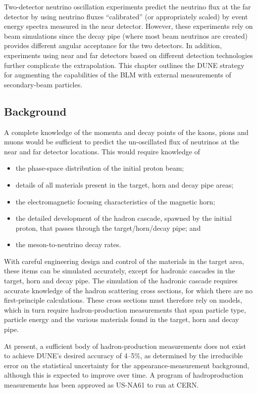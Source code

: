 Two-detector neutrino oscillation experiments predict the neutrino
flux at the far detector by using neutrino fluxes ``calibrated'' (or
appropriately scaled) by event energy spectra measured in the near
detector. However, these experiments rely on beam simulations since
the decay pipe (where most beam neutrinos are created) provides
different angular acceptance for the two detectors. In addition,
experiments using near and far detectors based on different detection
technologies further complicate the extrapolation. This chapter
outlines the DUNE strategy for augmenting the capabilities of the BLM
with external measurements of secondary-beam particles.

\subsection{Background}

A complete knowledge of the momenta and decay points of the kaons, pions and
muons would be sufficient to  predict the un-oscillated flux of neutrinos
at the near and far detector locations. This would require knowledge of

\begin{itemize}
\item the phase-space distribution of the initial proton beam;
\item details of all materials present in the target, horn and decay pipe areas;
\item  the electromagnetic focusing characteristics of the magnetic horn;
\item the detailed development of the hadron cascade, spawned by the
initial proton, that passes through the target/horn/decay pipe; and
\item the meson-to-neutrino decay rates.
\end{itemize}

With careful engineering design and control of the materials in the target
area, these items can be simulated accurately, except for hadronic cascades in
the target, horn and decay pipe. The simulation of the hadronic cascade requires
accurate knowledge of the hadron scattering cross sections, for which there are no
first-principle calculations. These cross sections must therefore rely on models, which
in turn require hadron-production measurements that span particle type, particle
energy and the various materials found in the target, horn and decay pipe.

At present, a sufficient body of hadron-production
measurements does not exist to achieve DUNE's desired accuracy of
4--5\%, as determined by the irreducible error on the statistical
uncertainty for the appearance-measurement background, although this
is expected to improve over time. A program of hadroproduction
measurements has been approved as US-NA61 to run at CERN.



